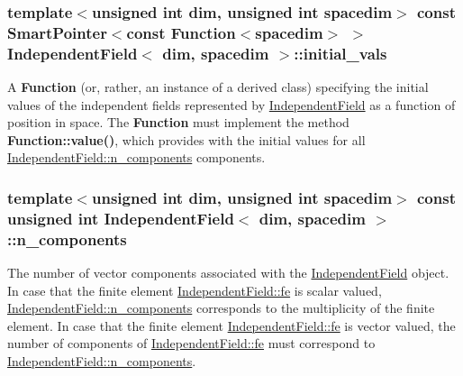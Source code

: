 \subsubsection[{\texorpdfstring{initial\+\_\+vals}{initial_vals}}]{\setlength{\rightskip}{0pt plus 5cm}template$<$unsigned int dim, unsigned int spacedim$>$ const {\bf Smart\+Pointer}$<$const {\bf Function}$<$spacedim$>$ $>$ {\bf Independent\+Field}$<$ dim, spacedim $>$\+::initial\+\_\+vals}\hypertarget{class_independent_field_a274c902785d2937a6065f7e09f3976c3}{}\label{class_independent_field_a274c902785d2937a6065f7e09f3976c3}
A {\bf Function} (or, rather, an instance of a derived class) specifying the initial values of the independent fields represented by \hyperlink{class_independent_field}{Independent\+Field} as a function of position in space. The {\bf Function} must implement the method {\bf Function\+::value()}, which provides with the initial values for all \hyperlink{class_independent_field_a7b19ea8c30d72cf27f05669de61f30a8}{Independent\+Field\+::n\+\_\+components} components. 
\subsubsection[{\texorpdfstring{n\+\_\+components}{n_components}}]{\setlength{\rightskip}{0pt plus 5cm}template$<$unsigned int dim, unsigned int spacedim$>$ const unsigned int {\bf Independent\+Field}$<$ dim, spacedim $>$\+::n\+\_\+components}\hypertarget{class_independent_field_a7b19ea8c30d72cf27f05669de61f30a8}{}\label{class_independent_field_a7b19ea8c30d72cf27f05669de61f30a8}
The number of vector components associated with the \hyperlink{class_independent_field}{Independent\+Field} object. In case that the finite element \hyperlink{class_independent_field_a1c583665b7710bd3b815b03ba026b6d3}{Independent\+Field\+::fe} is scalar valued, \hyperlink{class_independent_field_a7b19ea8c30d72cf27f05669de61f30a8}{Independent\+Field\+::n\+\_\+components} corresponds to the multiplicity of the finite element. In case that the finite element \hyperlink{class_independent_field_a1c583665b7710bd3b815b03ba026b6d3}{Independent\+Field\+::fe} is vector valued, the number of components of \hyperlink{class_independent_field_a1c583665b7710bd3b815b03ba026b6d3}{Independent\+Field\+::fe} must correspond to \hyperlink{class_independent_field_a7b19ea8c30d72cf27f05669de61f30a8}{Independent\+Field\+::n\+\_\+components}. 
